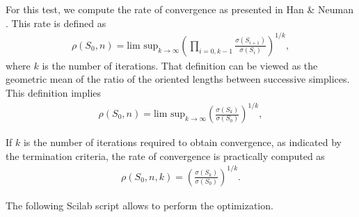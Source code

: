 For this test, we compute the rate of convergence as presented
in Han \& Neuman \cite{HanNeumann2006}. This rate is defined as 
\begin{eqnarray}
\label{rho-sp-rate-convergence}
\rho(S_0,n) = \textrm{lim sup}_{k\rightarrow \infty} 
\left(\prod_{i=0,k-1} \frac{\sigma(S_{i+1})}{\sigma(S_i)}\right)^{1/k},
\end{eqnarray}
where $k$ is the number of iterations.
That definition can be viewed as the geometric mean of the ratio of the 
oriented lengths between successive simplices.
This definition implies 
\begin{eqnarray}
\label{rho-sp-rate-convergence2}
\rho(S_0,n) = \textrm{lim sup}_{k\rightarrow \infty} 
\left(\frac{\sigma(S_k)}{\sigma(S_0)}\right)^{1/k},
\end{eqnarray}

If $k$ is the number of iterations required to obtain convergence, as 
indicated by the termination criteria, the rate of convergence is practically computed as 
\begin{eqnarray}
\rho(S_0,n,k) = \left( \frac{\sigma(S_{k})}{\sigma(S_0)}\right)^{1/k}.
\end{eqnarray}

The following Scilab script allows to perform the optimization.


